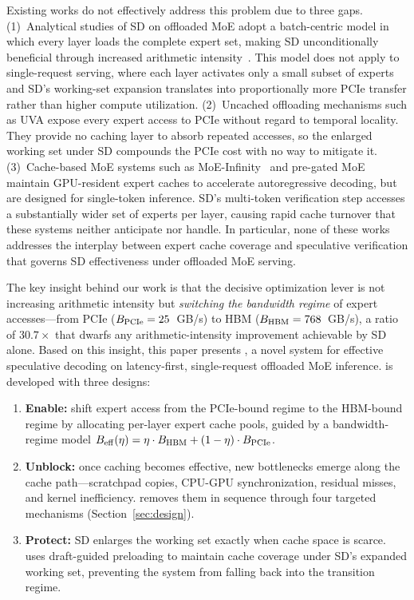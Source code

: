 Existing works do not effectively address this problem due to three gaps. (1)~Analytical studies of SD on offloaded MoE adopt a batch-centric model in which every layer loads the complete expert set, making SD unconditionally beneficial through increased arithmetic intensity~\cite{liu2025specmoeoffload}. This model does not apply to single-request serving, where each layer activates only a small subset of experts and SD's working-set expansion translates into proportionally more PCIe transfer rather than higher compute utilization. (2)~Uncached offloading mechanisms such as UVA expose every expert access to PCIe without regard to temporal locality. They provide no caching layer to absorb repeated accesses, so the enlarged working set under SD compounds the PCIe cost with no way to mitigate it. (3)~Cache-based MoE systems such as MoE-Infinity~\cite{xue2024moeinfinity} and pre-gated MoE~\cite{hwang2023pregated} maintain GPU-resident expert caches to accelerate autoregressive decoding, but are designed for single-token inference. SD's multi-token verification step accesses a substantially wider set of experts per layer, causing rapid cache turnover that these systems neither anticipate nor handle. In particular, none of these works addresses the interplay between expert cache coverage and speculative verification that governs SD effectiveness under offloaded MoE serving.

The key insight behind our work is that the decisive optimization lever is not increasing arithmetic intensity but \emph{switching the bandwidth regime} of expert accesses---from PCIe ($B_{\mathrm{PCIe}}=25$~GB/s) to HBM ($B_{\mathrm{HBM}}=768$~GB/s), a ratio of $30.7\times$ that dwarfs any arithmetic-intensity improvement achievable by SD alone. Based on this insight, this paper presents \sysname, a novel system for effective speculative decoding on latency-first, single-request offloaded MoE inference. \sysname is developed with three designs:
\begin{enumerate}[leftmargin=1.5em]
\item \textbf{Enable:} shift expert access from the PCIe-bound regime to the HBM-bound regime by allocating per-layer expert cache pools, guided by a bandwidth-regime model $B_{\mathrm{eff}}(\eta)=\eta\cdot B_{\mathrm{HBM}}+(1-\eta)\cdot B_{\mathrm{PCIe}}$.
\item \textbf{Unblock:} once caching becomes effective, new bottlenecks emerge along the cache path---scratchpad copies, CPU-GPU synchronization, residual misses, and kernel inefficiency. \sysname removes them in sequence through four targeted mechanisms (Section~\ref{sec:design}).
\item \textbf{Protect:} SD enlarges the working set exactly when cache space is scarce. \sysname uses draft-guided preloading to maintain cache coverage under SD's expanded working set, preventing the system from falling back into the transition regime.
\end{enumerate}


